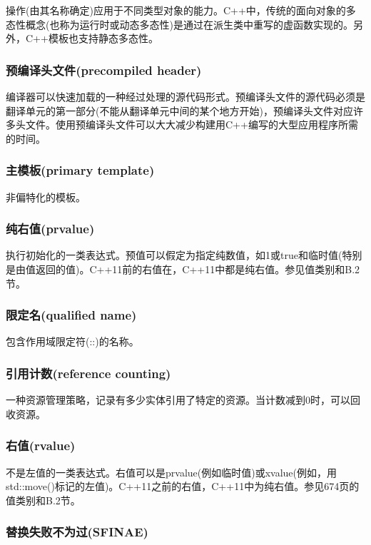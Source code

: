 操作(由其名称确定)应用于不同类型对象的能力。C++中，传统的面向对象的多态性概念(也称为运行时或动态多态性)是通过在派生类中重写的虚函数实现的。另外，C++模板也支持静态多态性。

\subsubsection{预编译头文件(precompiled header)}

编译器可以快速加载的一种经过处理的源代码形式。预编译头文件的源代码必须是翻译单元的第一部分(不能从翻译单元中间的某个地方开始)，预编译头文件对应许多头文件。使用预编译头文件可以大大减少构建用C++编写的大型应用程序所需的时间。

\subsubsection{主模板(primary template)}

非偏特化的模板。

\subsubsection{纯右值(prvalue)}

执行初始化的一类表达式。预值可以假定为指定纯数值，如1或true和临时值(特别是由值返回的值)。C++11前的右值在，C++11中都是纯右值。参见值类别和B.2节。

\subsubsection{限定名(qualified name)}

包含作用域限定符(::)的名称。

\subsubsection{引用计数(reference counting)}

一种资源管理策略，记录有多少实体引用了特定的资源。当计数减到0时，可以回收资源。

\subsubsection{右值(rvalue)}

不是左值的一类表达式。右值可以是prvalue(例如临时值)或xvalue(例如，用std::move()标记的左值)。C++11之前的右值，C++11中为纯右值。参见674页的值类别和B.2节。

\subsubsection{替换失败不为过(SFINAE)}

